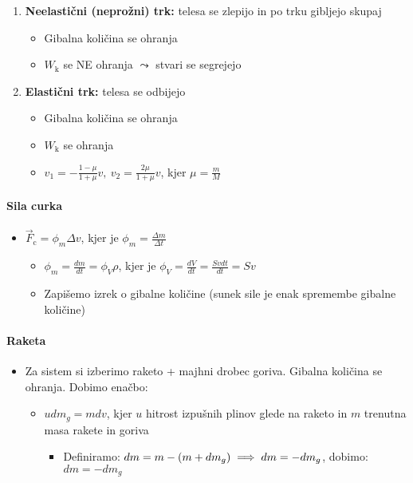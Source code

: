 \begin{enumerate}
    \item \textbf{Neelastični (neprožni) trk:} telesa se zlepijo in po trku gibljejo skupaj
    \begin{itemize}
        \item Gibalna količina se ohranja
        \item \(W_\text{k}\) se NE ohranja \(\leadsto\) stvari se segrejejo 
    \end{itemize}
    \item \textbf{Elastični trk:} telesa se odbijejo
    \begin{itemize}
        \item Gibalna količina se ohranja
        \item \(W_\text{k}\) se ohranja
        \item \(\boxed{v_1 = - \frac{1 - \mu}{1 + \mu} v, \ v_2 = \frac{2 \mu}{1 + \mu} v}\), kjer \(\mu = \frac{m}{M}\)
    \end{itemize}
\end{enumerate}

\paragraph{Sila curka}
\begin{itemize}
    \item \(\vec{F}_\text{c} = \phi_m \Delta v\), kjer je \(\phi_m = \frac{\Delta m}{\Delta t}\) 
    \begin{itemize}
        \item \(\phi_m = \frac{dm}{dt} = \phi_V \rho\), kjer je \(\phi_V = \frac{dV}{dt} = \frac{Svdt}{dt} = Sv\) 
        \item Zapišemo izrek o gibalne količine (sunek sile je enak spremembe gibalne količine)
    \end{itemize}
\end{itemize}

\paragraph{Raketa} 
\begin{itemize}
    \item Za sistem si izberimo raketo + majhni drobec goriva. Gibalna količina se ohranja. Dobimo enačbo:
    \begin{itemize}
        \item \(u dm_g = mdv\), kjer \(u\) hitrost izpušnih plinov glede na raketo in \(m\) trenutna masa rakete in goriva
        \begin{itemize}
            \item Definiramo: \(dm = m - (m + dm_g) \implies dm = -dm_g\), dobimo: \(dm = -dm_g\)
        \end{itemize}
    \end{itemize}
\end{itemize}


